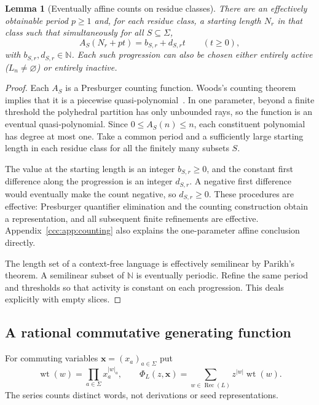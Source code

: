 \documentclass[11pt,letterpaper]{article}
\newtheorem{lemma}[theorem]{Lemma}
\theoremstyle{definition}
\theoremstyle{remark}
\newcommand{\N}{\mathbb N}
\newcommand{\rec}{\operatorname{Rec}}
\begin{document}
\begin{lemma}[Eventually affine counts on residue classes]
\label{ccc:lem:affinecounts}
There are an effectively obtainable period $p\geq1$ and, for each residue
class, a starting length $N_r$ in that class such that simultaneously for all
$S\subseteq\Sigma$,
\begin{equation}
 A_S(N_r+pt)=b_{S,r}+d_{S,r}t\qquad(t\geq0),
 \label{ccc:eq:affinecounts}
\end{equation}
with $b_{S,r},d_{S,r}\in\N$.
Each such progression can also be chosen either entirely active
($L_n\ne\varnothing$) or entirely inactive.
\end{lemma}
\begin{proof}
Each $A_S$ is a Presburger counting function. Woods's counting theorem
implies that it is a piecewise quasi-polynomial~\cite[Theorem~1.10]{Woods}.
In one parameter, beyond a finite threshold the polyhedral partition has
only unbounded rays, so the function is an eventual quasi-polynomial.
Since $0\leq A_S(n)\leq n$, each constituent polynomial has degree at most
one. Take a common period and a sufficiently large starting length in each
residue class for all the finitely many subsets $S$.

The value at the starting length is an integer $b_{S,r}\geq0$, and the
constant first difference along the progression is an integer $d_{S,r}$.
A negative first difference would eventually make the count negative, so
$d_{S,r}\geq0$. These procedures are effective: Presburger quantifier
elimination and the counting construction obtain a representation, and all
subsequent finite refinements are effective. Appendix~\ref{ccc:app:counting}
also explains the one-parameter affine conclusion directly.

The length set of a context-free language is effectively semilinear by
Parikh's theorem. A semilinear subset of $\N$ is eventually periodic.
Refine the same period and thresholds so that activity is constant on each
progression. This deals explicitly with empty slices.
\end{proof}

\subsection{A rational commutative generating function}

For commuting variables $\mathbf x=(x_a)_{a\in\Sigma}$ put
\[
 \operatorname{wt}(w)=\prod_{a\in\Sigma}x_a^{|w|_a},\qquad
 \Phi_L(z,\mathbf x)=\sum_{w\in\rec(L)}z^{|w|}\operatorname{wt}(w).
\]
The series counts distinct words, not derivations or seed representations.
\end{document}
